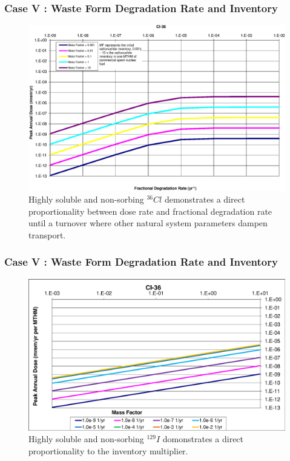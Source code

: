 \begin{frame}[c]
  \frametitle{Case V : Waste Form Degradation Rate and Inventory}

\begin{figure}[ht!]
\centering
\includegraphics[width=\linewidth]{WFDegAndInv/Cl-36.eps}
\caption{
Highly soluble and non-sorbing $^{36}Cl$ demonstrates a direct proportionality between dose rate and 
fractional degradation rate until a turnover where other natural system 
parameters dampen transport.} 
\label{fig:WFDegCl36}
\end{figure}

\end{frame}

\begin{frame}[c]
  \frametitle{Case V : Waste Form Degradation Rate and Inventory}
\begin{figure}[ht!]
\centering
\includegraphics[width=\linewidth]{WFDegAndInv/Cl-36-MF.eps}
\caption{
Highly soluble and non-sorbing $^{129}I$ domonstrates a direct 
proportionality to the inventory multiplier.}
\label{fig:WFDegCl36MF}
\end{figure}
\end{frame}

